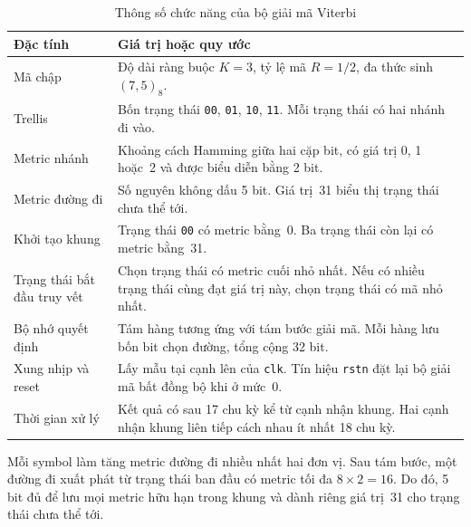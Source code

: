 \documentclass[12pt,a4paper]{article}
\renewcommand{\_}{\originalunderscore\allowbreak}
\begin{document}
\begin{table}[H]\centering\small
\begin{tabularx}{\textwidth}{@{}P{4.0cm}Y@{}}\toprule
\textbf{Đặc tính}&\textbf{Giá trị hoặc quy ước}\\\midrule
Mã chập & Độ dài ràng buộc $K=3$, tỷ lệ mã $R=1/2$, đa thức sinh $(7,5)_8$.\\
Trellis & Bốn trạng thái \texttt{00}, \texttt{01}, \texttt{10}, \texttt{11}. Mỗi trạng thái có hai nhánh đi vào.\\
Metric nhánh & Khoảng cách Hamming giữa hai cặp bit, có giá trị 0, 1 hoặc~2 và được biểu diễn bằng 2 bit.\\
Metric đường đi & Số nguyên không dấu 5 bit. Giá trị~31 biểu thị trạng thái chưa thể tới.\\
Khởi tạo khung & Trạng thái \texttt{00} có metric bằng~0. Ba trạng thái còn lại có metric bằng~31.\\
Trạng thái bắt đầu truy vết & Chọn trạng thái có metric cuối nhỏ nhất. Nếu có nhiều trạng thái cùng đạt giá trị này, chọn trạng thái có mã nhỏ nhất.\\
Bộ nhớ quyết định & Tám hàng tương ứng với tám bước giải mã. Mỗi hàng lưu bốn bit chọn đường, tổng cộng 32 bit.\\
Xung nhịp và reset & Lấy mẫu tại cạnh lên của \texttt{clk}. Tín hiệu \texttt{rstn} đặt lại bộ giải mã bất đồng bộ khi ở mức~0.\\
Thời gian xử lý & Kết quả có sau 17 chu kỳ kể từ cạnh nhận khung. Hai cạnh nhận khung liên tiếp cách nhau ít nhất 18 chu kỳ.\\
\bottomrule\end{tabularx}
\caption{Thông số chức năng của bộ giải mã Viterbi}\label{tab:system-spec}
\end{table}

Mỗi symbol làm tăng metric đường đi nhiều nhất hai đơn vị. Sau tám bước, một đường đi xuất phát từ trạng thái ban đầu có metric tối đa $8\times 2=16$. Do đó, 5 bit đủ để lưu mọi metric hữu hạn trong khung và dành riêng giá trị~31 cho trạng thái chưa thể tới.
\end{document}
